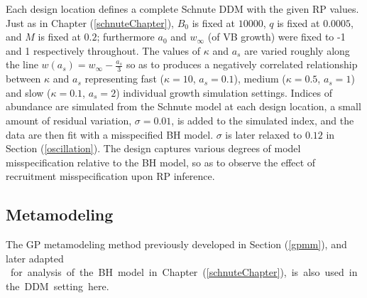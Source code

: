 %
Each design location defines a complete Schnute DDM with
the given RP values. Just as in Chapter (\ref{schnuteChapter}), $B_0$ is fixed 
at $10000$, $q$ is fixed at $0.0005$, and $M$ is fixed at $0.2$; furthermore $a_0$ and $w_\infty$ (of VB 
growth) were fixed to -1 and 1 respectively throughout.
The values of $\kappa$ and $a_s$ are varied roughly along the line $w(a_s)=w_\infty-\frac{a_s}{3}$ 
so as to produces a negatively correlated relationship between $\kappa$ and 
$a_s$ representing fast ($\kappa=10$,  $a_s=0.1$), medium ($\kappa=0.5$,  $a_s=1$) and 
slow ($\kappa=0.1$,  $a_s=2$) individual growth simulation settings.
Indices of abundance are simulated from the Schnute model at each design 
location, a small amount of residual variation, $\sigma = 0.01$,
is added to the simulated index, and the data are then fit with a misspecified
BH model. $\sigma$ is later relaxed to $0.12$ in Section (\ref{oscillation}). The design captures various degrees of model misspecification
relative to the BH model, so as to observe the effect of recruitment
misspecification upon RP inference.


%

%
\subsection{Metamodeling}

%
The GP metamodeling method previously developed in Section (\ref{gpmm}), and later adapted 
\mbox{%
for analysis of the BH model in Chapter (\ref{schnuteChapter}), 
is also used in the DDM setting here.
}


